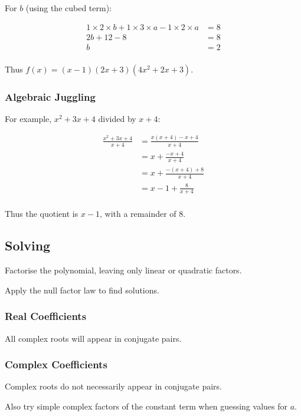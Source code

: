 \documentclass[a4paper,11pt]{article}
\begin{document}
For $b$ (using the cubed term):

$$
\begin{aligned}
1 \times 2 \times b + 1 \times 3 \times a - 1 \times 2 \times a & = 8 \\
2b + 12 - 8 & = 8 \\
b & = 2 \\
\end{aligned}
$$

Thus $f(x) = (x - 1)(2x + 3)(4x^2 + 2x + 3)$.


\subsubsection{Algebraic Juggling}

For example, $x^2 + 3x + 4$ divided by $x + 4$:

$$
\begin{aligned}
\frac{x^2 + 3x + 4}{x + 4} & = \frac{x(x + 4) - x + 4}{x + 4} \\
& = x + \frac{-x + 4}{x + 4} \\
& = x + \frac{-(x + 4) + 8}{x + 4} \\
& = x - 1 + \frac{8}{x + 4} \\
\end{aligned}
$$

Thus the quotient is $x - 1$, with a remainder of $8$.


\subsection{Solving}

Factorise the polynomial, leaving only linear or quadratic factors.

Apply the null factor law to find solutions.


\subsubsection{Real Coefficients}

All complex roots will appear in conjugate pairs.


\subsubsection{Complex Coefficients}

Complex roots do not necessarily appear in conjugate pairs.

Also try simple complex factors of the constant term when guessing values for
$a$.
\end{document}
